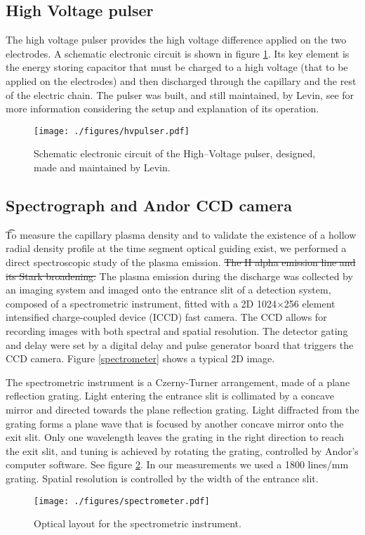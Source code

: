 \documentclass[nofonts]{tufte-book}
\begin{document}
	\subsection{High Voltage pulser}
	The high voltage pulser provides the high voltage difference applied on the two electrodes. A schematic electronic circuit is shown in figure \ref{fig:hvpulser}. Its key element is the energy storing capacitor that must be charged to a high voltage (that to be applied on the electrodes) and then discharged through the capillary and the rest of the electric chain. The pulser was built, and still maintained, by Levin, see \cite{Levin2009, pp.46-47} for more information considering the setup and explanation of its operation.
	\begin{figure}
		\texttt{[image: ./figures/hvpulser.pdf]}
		\caption{Schematic electronic circuit of the High--Voltage pulser, designed, made and maintained by Levin.}
		\label{fig:hvpulser}
	\end{figure}

	\subsection{Spectrograph and Andor CCD camera}\label{ssec:spectro}
	\t{To measure the capillary plasma density and to validate the existence of a hollow radial density profile at the time segment optical guiding exist, we performed a direct spectroscopic study of the plasma emission.} \st{The H alpha emission line and its Stark broadening.} The plasma emission during the discharge was collected by an imaging system and imaged onto the entrance slit of a detection system, composed of a spectrometric instrument, fitted with a 2D 1024$\times$256 element intensified charge-coupled device (ICCD) fast camera. The CCD allows for recording images with both spectral and spatial resolution. The detector gating and delay were set by a digital delay and pulse generator board that triggers the CCD camera. Figure \ref{spectrometer} shows a typical 2D image. 

	The spectrometric instrument is a Czerny-Turner arrangement, made of a plane reflection grating. Light entering the entrance slit is collimated by a concave mirror and directed towards the plane reflection grating. Light diffracted from the grating forms a plane wave that is focused by another concave mirror onto the exit slit. Only one wavelength leaves the grating in the right direction to reach the exit slit, and tuning is achieved by rotating the grating, controlled by Andor's computer software. See figure \ref{fig:spectrometer}. In our measurements we used a 1800 lines/mm grating. Spatial resolution is controlled by the width of the entrance slit.
		\begin{figure}
		    \texttt{[image: ./figures/spectrometer.pdf]}
		    \caption{Optical layout for the spectrometric instrument.}
		    \label{fig:spectrometer}
		\end{figure}
		
\end{document}
